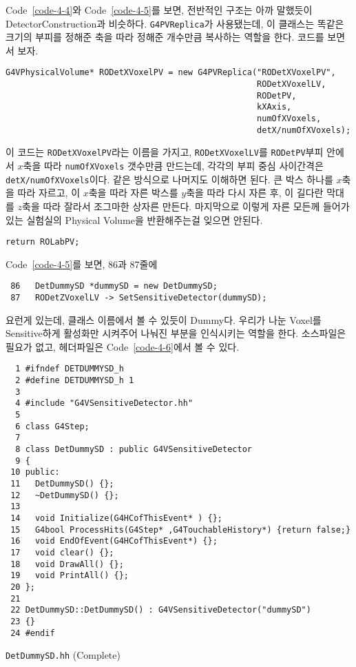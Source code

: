 Code~\ref{code-4-4}와 Code~\ref{code-4-5}를 보면, 전반적인 구조는 아까 말했듯이
DetectorConstruction과 비슷하다. \texttt{G4PVReplica}가 사용됐는데, 이 클래스는
똑같은 크기의 부피를 정해준 축을 따라 정해준 개수만큼 복사하는 역할을 한다.
코드를 보면서 보자. 
\begin{pc}
\begin{lstlisting}
G4VPhysicalVolume* RODetXVoxelPV = new G4PVReplica("RODetXVoxelPV",
                                                   RODetXVoxelLV,
                                                   RODetPV,
                                                   kXAxis,
                                                   numOfXVoxels,
                                                   detX/numOfXVoxels);
\end{lstlisting}
\end{pc}
이 코드는 \texttt{RODetXVoxelPV}라는 이름을 가지고, \texttt{RODetXVoxelLV}를
\texttt{RODetPV}부피 안에서 $x$축을 따라 \texttt{numOfXVoxels} 갯수만큼
만드는데, 각각의 부피 중심 사이간격은 \texttt{detX/numOfXVoxels}이다. 같은
방식으로 나머지도 이해하면 된다. 큰 박스 하나를 $x$축을 따라 자르고, 이 $x$축을
따라 자른 박스를 $y$축을 따라 다시 자른 후, 이 길다란 막대를 $z$축을 따라
잘라서 조그마한 상자른 만든다. 마지막으로 이렇게 자른 모든께 들어가 있는
실험실의 Physical Volume을 반환해주는걸 잊으면 안된다.
\begin{pc}
\begin{lstlisting}
return ROLabPV;
\end{lstlisting}
\end{pc}
Code~\ref{code-4-5}를 보면, 86과 87줄에 
\begin{pc}
\begin{lstlisting}
 86   DetDummySD *dummySD = new DetDummySD;
 87   RODetZVoxelLV -> SetSensitiveDetector(dummySD);
\end{lstlisting}
\end{pc}
요런게 있는데, 클래스 이름에서 볼 수 있듯이 Dummy다. 우리가 나눈 Voxel를
Sensitive하게 활성화만 시켜주어 나눠진 부분을 인식시키는 역할을 한다.
소스파일은 필요가 없고, 헤더파일은 Code~\ref{code-4-6}에서 볼 수 있다.

\begin{code}[p]
\begin{lstlisting}
  1 #ifndef DETDUMMYSD_h
  2 #define DETDUMMYSD_h 1
  3 
  4 #include "G4VSensitiveDetector.hh"
  5 
  6 class G4Step;
  7 
  8 class DetDummySD : public G4VSensitiveDetector
  9 {
 10 public:
 11   DetDummySD() {};
 12   ~DetDummySD() {};
 13 
 14   void Initialize(G4HCofThisEvent* ) {};
 15   G4bool ProcessHits(G4Step* ,G4TouchableHistory*) {return false;}
 16   void EndOfEvent(G4HCofThisEvent*) {};
 17   void clear() {};
 18   void DrawAll() {};
 19   void PrintAll() {};
 20 };
 21 
 22 DetDummySD::DetDummySD() : G4VSensitiveDetector("dummySD")
 23 {}
 24 #endif
\end{lstlisting}
\caption{\texttt{DetDummySD.hh} (Complete) \label{code-4-6}}
\end{code}

